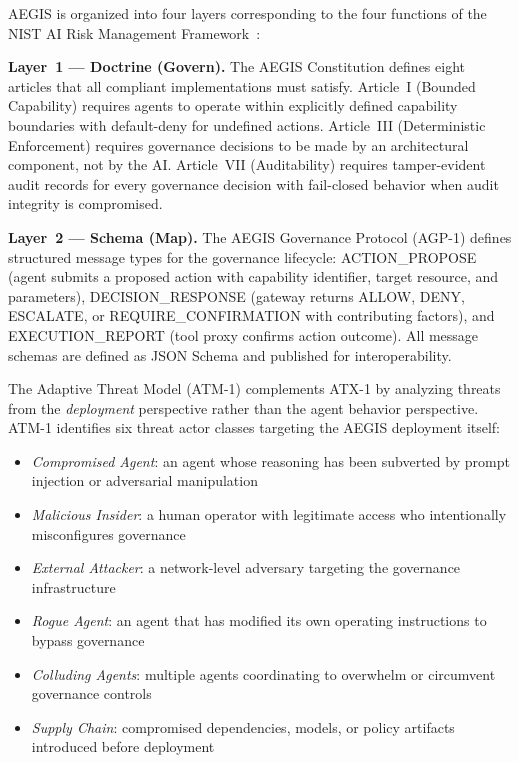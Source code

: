 \documentclass[journal]{IEEEtran}
\begin{document}
AEGIS is organized into four layers corresponding to the four functions of the NIST AI Risk Management Framework~\cite{nist_airmf}:

\textbf{Layer~1 --- Doctrine (Govern).} The AEGIS Constitution defines eight articles that all compliant implementations must satisfy. Article~I (Bounded Capability) requires agents to operate within explicitly defined capability boundaries with default-deny for undefined actions. Article~III (Deterministic Enforcement) requires governance decisions to be made by an architectural component, not by the AI. Article~VII (Auditability) requires tamper-evident audit records for every governance decision with fail-closed behavior when audit integrity is compromised.

\textbf{Layer~2 --- Schema (Map).} The AEGIS Governance Protocol (AGP-1) defines structured message types for the governance lifecycle: ACTION\_PROPOSE (agent submits a proposed action with capability identifier, target resource, and parameters), DECISION\_RESPONSE (gateway returns ALLOW, DENY, ESCALATE, or REQUIRE\_CONFIRMATION with contributing factors), and EXECUTION\_REPORT (tool proxy confirms action outcome). All message schemas are defined as JSON Schema and published for interoperability.

The Adaptive Threat Model (ATM-1) complements ATX-1 by analyzing threats from the \textit{deployment} perspective rather than the agent behavior perspective. ATM-1 identifies six threat actor classes targeting the AEGIS deployment itself:

\begin{itemize}
\item \textit{Compromised Agent}: an agent whose reasoning has been subverted by prompt injection or adversarial manipulation
\item \textit{Malicious Insider}: a human operator with legitimate access who intentionally misconfigures governance
\item \textit{External Attacker}: a network-level adversary targeting the governance infrastructure
\item \textit{Rogue Agent}: an agent that has modified its own operating instructions to bypass governance
\item \textit{Colluding Agents}: multiple agents coordinating to overwhelm or circumvent governance controls
\item \textit{Supply Chain}: compromised dependencies, models, or policy artifacts introduced before deployment
\end{itemize}
\end{document}

